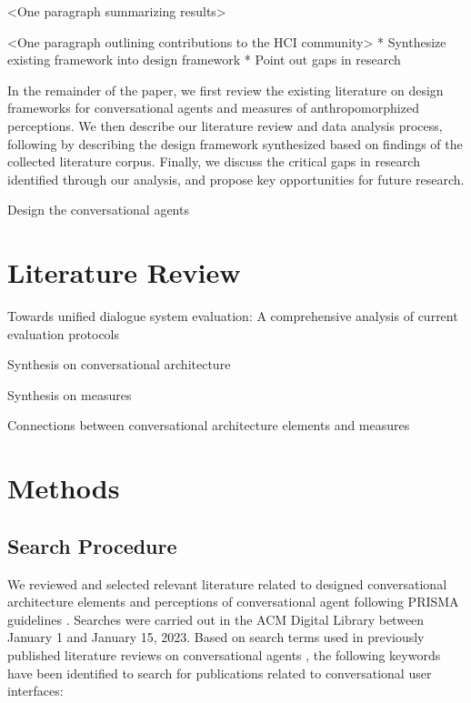 \documentclass[sigconf,screen,review, anonymous]{acmart}
\begin{document}
<One paragraph summarizing results>

<One paragraph outlining contributions to the HCI community>
* Synthesize existing framework into design framework \newline
* Point out gaps in research \newline

In the remainder of the paper, we first review the existing literature on design frameworks for conversational agents and measures of anthropomorphized perceptions. We then describe our literature review and data analysis process, following by describing the design framework synthesized based on findings of the collected literature corpus. Finally, we discuss the critical gaps in research identified through our analysis, and propose key opportunities for future research.


Design the conversational agents


\section{Literature Review}

\cite{finch2020towards} Towards unified dialogue system evaluation: A comprehensive analysis of current evaluation protocols

Synthesis on conversational architecture

Synthesis on measures

Connections between conversational architecture elements and measures


\section{Methods}

\subsection{Search Procedure}

We reviewed and selected relevant literature related to designed conversational architecture elements and perceptions of conversational agent following PRISMA guidelines \cite{prisma}. Searches were carried out in the ACM Digital Library between January 1 and January 15, 2023. Based on search terms used in previously published literature reviews on conversational agents \cite{clark2019state}\cite{rapp2021human} , the following keywords have been identified to search for publications related to conversational user interfaces:
\newline
\end{document}
